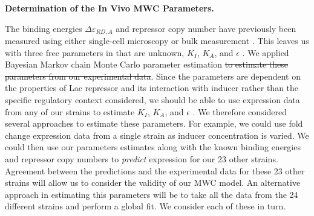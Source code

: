 \noindent \textbf{Determination of the In Vivo  MWC Parameters.}

The binding energies $\Delta \varepsilon_{RD,A}$ and repressor copy number have
previously been measured using either single-cell microscopy or bulk measurement
\cite{Oehler1994,Vilar2003,Garcia2011, Brewster2014}. This leaves us with three
free parameters in \eref[eq7] that are unknown, $K_I$, $K_A$, and $\epsilon$ . We
applied Bayesian Markov chain Monte Carlo parameter estimation \sout{to estimate these
parameters from our experimental data}. Since the parameters are dependent on the
properties of Lac repressor and its interaction with inducer rather than the
specific regulatory context considered, we should be able to use expression data
from any of our strains to estimate $K_I$, $K_A$, and $\epsilon$
. We therefore considered several approaches to estimate these
parameters. For example, we could use fold change expression data from a single
strain as inducer concentration is varied. We could then use our parameters
estimates along with the known binding energies and repressor copy numbers to
\textit{predict} expression for our 23 other strains. Agreement between the
predictions and the experimental data for these 23 other strains will allow us
to consider the validity of our MWC model. An alternative approach in estimating
this parameters will be to take all the data from the 24 different strains and
perform a global fit. We consider each of these in turn. 


